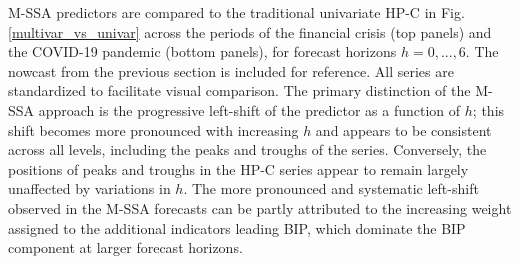 \documentclass[a4paper]{article}
\begin{document}
M-SSA predictors are compared to the traditional univariate HP-C in Fig. \eqref{multivar_vs_univar} across the periods of the financial crisis (top panels) and the COVID-19 pandemic (bottom panels), for forecast horizons $h=0,...,6$. The nowcast from the previous section is included for reference. All series are standardized to facilitate visual comparison. The primary distinction of the M-SSA approach is the progressive left-shift of the predictor as a function of $h$; this shift becomes more pronounced with increasing $h$ and appears to be consistent across all levels, including the peaks and troughs of the series. Conversely, the positions of peaks and troughs in the HP-C series appear to remain largely unaffected by variations in $h$. The more pronounced and systematic left-shift observed in the M-SSA forecasts can be partly attributed to the increasing weight assigned to the additional indicators leading BIP, which dominate the BIP component at larger forecast horizons. %
\end{document}
